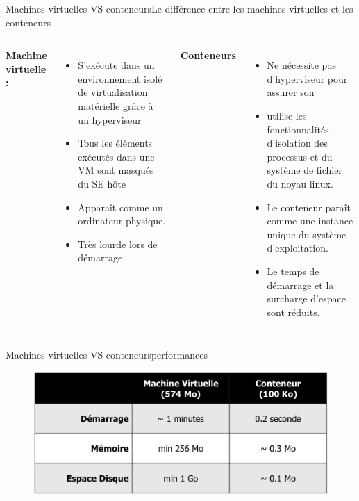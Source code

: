 \documentclass{beamer}
\begin{document}
\begin{frame}{Machines virtuelles VS conteneurs}{Le différence entre les machines virtuelles et les conteneurs}
        \begin{columns}
            \textbf{ Machine virtuelle :} 
            \begin{itemize}
                \item S’exécute dans un environnement isolé de virtualisation 
                    matérielle grâce à un hyperviseur 
                \item Tous les éléments exécutés dans une VM sont
                    masqués du SE hôte 
                \item Apparaît comme un ordinateur physique.
                \item Très lourde lors de démarrage.
            \end{itemize}
            \textbf{Conteneurs}
            \begin{itemize}
                \item Ne nécessite pas d’hyperviseur pour assurer son 
                \item utilise les fonctionnalités d’isolation des processus et du système de fichier du noyau linux.
                \item Le conteneur paraît comme une instance unique du système d’exploitation.
                \item Le temps de démarrage et la surcharge d'espace sont réduits. 
            \end{itemize}
        \end{columns}

\end{frame}

\begin{frame}{Machines virtuelles VS conteneurs}{performances}
         \begin{figure}
             \begin{center}
                 \includegraphics[width=1\textwidth]{performances.png}
             \end{center}
         \end{figure}
\end{frame}
\end{document}
